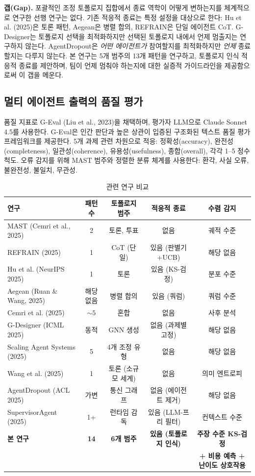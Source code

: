 \documentclass[a4paper,11pt]{article}
\begin{document}
\textbf{갭(Gap).} 포괄적인 조정 토폴로지 집합에서 종료 역학이 어떻게 변하는지를 체계적으로 연구한 선행 연구는 없다. 기존 적응적 종료는 특정 설정을 대상으로 한다: Hu et al. (2025)은 토론 패턴, Aegean은 병렬 합의, REFRAIN은 단일 에이전트 CoT. G-Designer는 토폴로지 선택을 최적화하지만 선택된 토폴로지 내에서 언제 멈출지는 연구하지 않는다. AgentDropout은 \emph{어떤 에이전트가} 참여할지를 최적화하지만 \emph{언제} 종료할지는 다루지 않는다. 본 연구는 5개 범주의 13개 패턴을 연구하고, 토폴로지 인식 적응적 종료를 제안하며, 팀이 언제 멈춰야 하는지에 대한 실증적 가이드라인을 제공함으로써 이 갭을 메운다.

\subsection{멀티 에이전트 출력의 품질 평가}

품질 지표로 G-Eval (Liu et al., 2023)을 채택하며, 평가자 LLM으로 Claude Sonnet 4.5를 사용한다. G-Eval은 인간 판단과 높은 상관이 입증된 구조화된 텍스트 품질 평가 프레임워크를 제공한다. 5개 과제 관련 차원으로 적응: 정확성(accuracy), 완전성(completeness), 일관성(coherence), 유용성(usefulness), 종합(overall), 각각 1--5 정수 척도. 오류 감지를 위해 MAST 범주와 정렬한 분류 체계를 사용한다: 환각, 사실 오류, 불완전성, 불일치, 무관성.

\begin{table}[t]
\centering
\caption{관련 연구 비교}
\label{tab:related-work}
{\small
\begin{tabular}{lcccc}
\toprule
\textbf{연구} & \textbf{패턴 수} & \textbf{토폴로지 범주} & \textbf{적응적 종료} & \textbf{수렴 감지} \\
\midrule
MAST (Cemri et al., 2025) & 2 & 토론, 투표 & 없음 & 궤적 수준 \\
REFRAIN (2025) & 1 & CoT (단일) & 있음 (판별기+UCB) & 해당 없음 \\
Hu et al. (NeurIPS 2025) & 1 & 토론 & 있음 (KS-검정) & 분포 수준 \\
Aegean (Ruan \& Wang, 2025) & 해당 없음 & 병렬 합의 & 있음 (쿼럼) & 쿼럼 수준 \\
Cemri et al. (2025) & ${\sim}5$ & 혼합 & 없음 & 사후 분석 \\
G-Designer (ICML 2025) & 동적 & GNN 생성 & 없음 (과제별 고정) & 해당 없음 \\
Scaling Agent Systems (2025) & 5 & 4개 조정 유형 & 없음 & 해당 없음 \\
Wang et al. (2025) & 1 & 토론 (소규모 세계) & 없음 & 의미 엔트로피 \\
AgentDropout (ACL 2025) & 가변 & 통신 그래프 & 없음 (에이전트 제거) & 해당 없음 \\
SupervisorAgent (2025) & 1+ & 런타임 감독 & 있음 (LLM-프리 필터) & 컨텍스트 수준 \\
\midrule
\textbf{본 연구} & \textbf{14} & \textbf{6개 범주} & \textbf{있음 (토폴로지 인식)} & \textbf{주장 수준 KS-검정} \\
 & & & & \textbf{+ 비용 예측 + 난이도 상호작용} \\
\bottomrule
\end{tabular}
}
\end{table}
\end{document}
